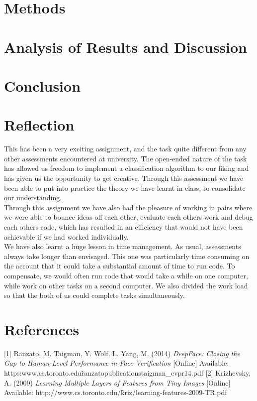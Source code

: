 \documentclass[%
 reprint,
 amsmath,amssymb,
 aps,
]{revtex4-1}
\begin{document}
	
\section{\label{sec:level1}Methods} 

\section{\label{sec:level1}Analysis of Results and Discussion}	
	
\section{\label{sec:level1}Conclusion}

\section{\label{sec:level1}Reflection}
\indent This has been a very exciting assignment, and the task quite different from any other assessments encountered at university. The open-ended nature of the task has allowed us freedom to implement a classification algorithm to our liking and has given us the opportunity to get creative. Through this assessment we have been able to put into practice the theory we have learnt in class, to consolidate our understanding.
\\ \indent Through this assignment we have also had the pleasure of working in pairs where we were able to bounce ideas off each other, evaluate each others work and debug each others code, which has resulted in an efficiency that would not have been achievable if we had worked individually. 
\\ \indent We have also learnt a huge lesson in time management. As usual, assessments always take longer than envisaged. This one was particularly time consuming on the account that it could take a substantial amount of time to run code. To compensate, we would often run code that would take a while on one computer, while work on other tasks on a second computer. We also divided the work load so that the both of us could complete tasks simultaneously.
\section{\label{sec:level1}References}	

[1] Ranzato, M. Taigman, Y. Wolf, L. Yang, M. (2014) \textit{DeepFace: Closing the Gap to Human-Level Performance in Face Verification} [Online] Available: https:\/\/www.cs.toronto.edu\/\~ranzato\/publications\/taigman\_cvpr14.pdf
[2] Krizhevsky, A. (2009) \textit{Learning Multiple Layers of Features from Tiny Images} [Online] Available: http://www.cs.toronto.edu/\~kriz/learning-features-2009-TR.pdf
\end{document}

